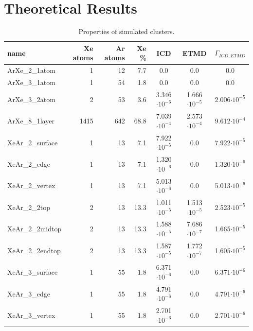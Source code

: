 \section{Theoretical Results}


\begin{table}
\centering
\caption{Properties of simulated clusters.}
\begin{tabular}{lrrrccc}
\toprule
name                 & Xe atoms & Ar atoms & Xe \% &   ICD                &  ETMD                & $\Gamma_{ICD,ETMD}$\\
\midrule
ArXe\_2\_1atom       &      1   &     12   &  7.7  &      0.0             &  0.0                 &     0.0            \\
ArXe\_3\_1atom       &      1   &     54   &  1.8  &      0.0             &  0.0                 &     0.0            \\ 
ArXe\_3\_2atom       &      2   &     53   &  3.6  & 3.346$\cdot 10^{-6}$ & 1.666$\cdot 10^{-5}$ & 2.006$\cdot 10^{-5}$ \\
ArXe\_8\_1layer      &   1415   &    642   & 68.8  & 7.039$\cdot 10^{-4}$ & 2.573$\cdot 10^{-4}$ & 9.612$\cdot 10^{-4}$ \\
\midrule
XeAr\_2\_surface     &      1   &     13   &  7.1  & 7.922$\cdot 10^{-5}$ & 0.0                  & 7.922$\cdot 10^{-5}$ \\
XeAr\_2\_edge        &      1   &     13   &  7.1  & 1.320$\cdot 10^{-6}$ & 0.0                  & 1.320$\cdot 10^{-6}$ \\
XeAr\_2\_vertex      &      1   &     13   &  7.1  & 5.013$\cdot 10^{-6}$ & 0.0                  & 5.013$\cdot 10^{-6}$ \\
XeAr\_2\_2top        &      2   &     13   & 13.3  & 1.011$\cdot 10^{-5}$ & 1.513$\cdot 10^{-5}$ & 2.523$\cdot 10^{-5}$ \\
XeAr\_2\_2midtop     &      2   &     13   & 13.3  & 1.588$\cdot 10^{-5}$ & 7.686$\cdot 10^{-7}$ & 1.665$\cdot 10^{-5}$ \\
XeAr\_2\_2endtop     &      2   &     13   & 13.3  & 1.587$\cdot 10^{-5}$ & 1.772$\cdot 10^{-7}$ & 1.605$\cdot 10^{-5}$ \\
XeAr\_3\_surface     &      1   &     55   &  1.8  & 6.371$\cdot 10^{-6}$ & 0.0                  & 6.371$\cdot 10^{-6}$ \\
XeAr\_3\_edge        &      1   &     55   &  1.8  & 4.791$\cdot 10^{-6}$ & 0.0                  & 4.791$\cdot 10^{-6}$ \\
XeAr\_3\_vertex      &      1   &     55   &  1.8  & 2.701$\cdot 10^{-6}$ & 0.0                  & 2.701$\cdot 10^{-6}$ \\

\end{tabular}
\end{table}
